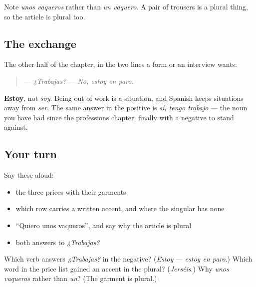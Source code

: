 Note \emph{unos vaqueros} rather than \emph{un vaquero}. A pair of trousers is a plural thing, so the article is plural too.

\subsection*{The exchange}
The other half of the chapter, in the two lines a form or an interview wants:

\begin{quote}
— \emph{¿Trabajas?} — \emph{No, estoy en paro.}
\end{quote}

\textbf{Estoy}, not \emph{soy}. Being out of work is a situation, and Spanish keeps situations away from \emph{ser}. The same answer in the positive is \emph{sí, tengo trabajo} — the noun you have had since the professions chapter, finally with a negative to stand against.

\subsection*{Your turn}
Say these aloud:

\begin{itemize}
\raggedright
  \item the three prices with their garments
  \item which row carries a written accent, and where the singular has none
  \item \textquotedblleft{}Quiero unos vaqueros\textquotedblright{}, and say why the article is plural
  \item both answers to \emph{¿Trabajas?}
\end{itemize}

\begin{tcolorbox}[breakable,colback=teal!4,colframe=teal!35!black,title={Before you move on}]
Which verb answers \emph{¿Trabajas?} in the negative? (\emph{Estoy} — \emph{estoy en paro}.) Which word in the price list gained an accent in the plural? (\emph{Jerséis}.) Why \emph{unos vaqueros} rather than \emph{un}? (The garment is plural.)
\end{tcolorbox}
